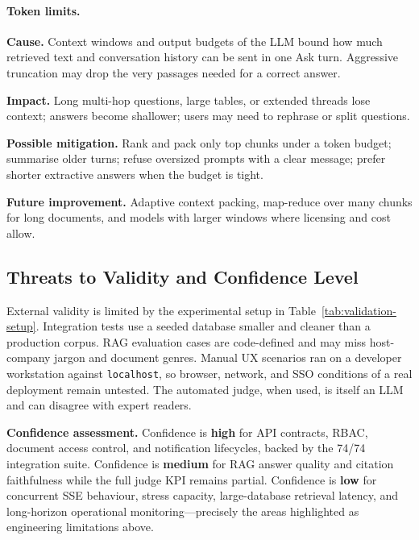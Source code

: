\paragraph{Token limits.}
\noindent\textbf{Cause.} Context windows and output budgets of the LLM bound how
much retrieved text and conversation history can be sent in one Ask turn.
Aggressive truncation may drop the very passages needed for a correct answer.\par\vspace{0.15em}
\noindent\textbf{Impact.} Long multi-hop questions, large tables, or extended
threads lose context; answers become shallower; users may need to rephrase or
split questions.\par\vspace{0.15em}
\noindent\textbf{Possible mitigation.} Rank and pack only top chunks under a
token budget; summarise older turns; refuse oversized prompts with a clear
message; prefer shorter extractive answers when the budget is tight.\par\vspace{0.15em}
\noindent\textbf{Future improvement.} Adaptive context packing, map-reduce over
many chunks for long documents, and models with larger windows where licensing
and cost allow.
\par\vspace{0.35em}
\subsection{Threats to Validity and Confidence Level}

External validity is limited by the experimental setup in
Table~\ref{tab:validation-setup}. Integration tests use a seeded database smaller
and cleaner than a production corpus. RAG evaluation cases are code-defined and
may miss host-company jargon and document genres. Manual UX scenarios ran on a
developer workstation against \texttt{localhost}, so browser, network, and SSO
conditions of a real deployment remain untested. The automated judge, when used,
is itself an LLM and can disagree with expert readers.

\textbf{Confidence assessment.} Confidence is \textbf{high} for API contracts,
RBAC, document access control, and notification lifecycles, backed by the 74/74
integration suite. Confidence is \textbf{medium} for RAG answer quality and
citation faithfulness while the full judge KPI remains partial. Confidence is
\textbf{low} for concurrent SSE behaviour, stress capacity, large-database
retrieval latency, and long-horizon operational monitoring---precisely the areas
highlighted as engineering limitations above.

